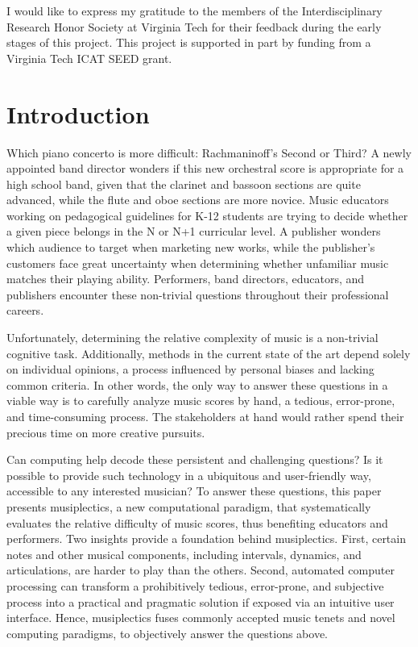 \documentclass[12pt]{report}
\begin{document}
I would like to express my gratitude to the members of the Interdisciplinary Research Honor Society at Virginia Tech for their feedback during the early stages of this project. This project is supported in part by funding from a Virginia Tech ICAT SEED grant.

\pagebreak

\tableofcontents
\pagebreak

\listoffigures
\pagebreak

\listoftables
\pagebreak

\pagestyle{myheadings}

\chapter{Introduction}
\label{sec:intro}

Which piano concerto is more difficult: Rachmaninoff's Second or Third? A newly appointed band director wonders if this new orchestral score is appropriate for a high school band, given that the clarinet and bassoon sections are quite advanced, while the flute and oboe sections are more novice. Music educators working on pedagogical guidelines for K-12 students are trying to decide whether a given piece belongs in the N or N+1 curricular level. A publisher wonders which audience to target when marketing new works, while the publisher's customers face great uncertainty when determining whether unfamiliar music matches their playing ability. Performers, band directors, educators, and publishers encounter these non-trivial questions throughout their professional careers. 


Unfortunately, determining the relative complexity of music is a non-trivial cognitive task. Additionally, methods in the current state of the art depend solely on individual opinions, a process influenced by personal biases and lacking common criteria. In other words, the only way to answer these questions in a viable way is to carefully analyze music scores by hand, a tedious, error-prone, and time-consuming process. The stakeholders at hand would rather spend their precious time on more creative pursuits.

Can computing help decode these persistent and challenging questions? Is it possible to provide such technology in a ubiquitous and user-friendly way, accessible to any interested musician? To answer these questions, this paper presents musiplectics, a new computational paradigm, that systematically evaluates the relative difficulty of music scores, thus benefiting educators and performers. Two insights provide a foundation behind musiplectics. First, certain notes and other musical components, including intervals, dynamics, and articulations, are harder to play than the others. Second, automated computer processing can transform a prohibitively tedious, error-prone, and subjective process into a practical and pragmatic solution if exposed via an intuitive user interface. Hence, musiplectics fuses commonly accepted music tenets and novel computing paradigms, to objectively answer the questions above. 
\end{document}
